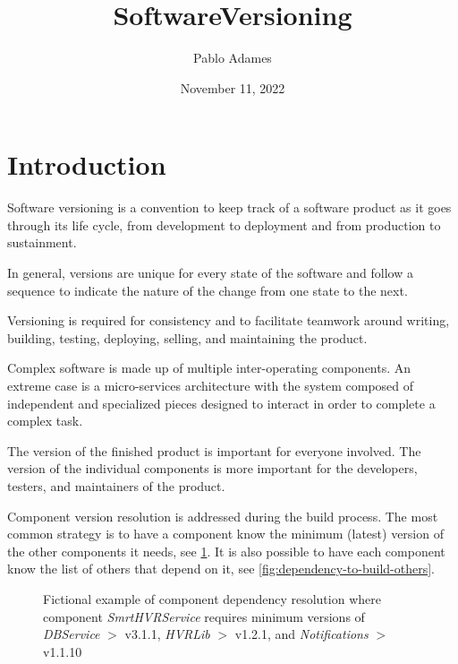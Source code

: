 \documentclass[12pt,dvipsnames]{article}
\title{SoftwareVersioning}
\author{Pablo Adames}
\date{November 11, 2022}
\begin{document}
\maketitle

\section{Introduction}

Software versioning is a convention to keep track of a software product as it goes through its life cycle, from development to deployment and from production to sustainment\cite{Wikipedia_software_version_short}.

In general, versions are unique for every state of the software and follow a sequence to indicate the nature of the change from one state to the next.

Versioning is required for consistency and to facilitate teamwork around writing, building, testing, deploying, selling, and maintaining the product. 


Complex software is made up of multiple inter-operating components. 
An extreme case is a micro-services architecture with the system composed of independent and specialized pieces designed to interact in order to complete a complex task.

The version of the finished product is important for everyone involved. 
The version of the individual components is more important for the developers, testers, and maintainers of the product.

Component version resolution is addressed during the build process.
The most common strategy is to have a component know the minimum (latest) version of the other components it needs, see \ref{fig:dependency-to-build-self}. 
It is also possible to have each component know the list of others that depend on it, see \ref{fig:dependency-to-build-others}.  

\begin{figure}
    \centering
  \caption{Fictional example of component dependency resolution where component \textit{SmrtHVRService} requires minimum versions of \textit{DBService} $>$ v3.1.1, \textit{HVRLib} $>$ v1.2.1, and \textit{Notifications} $>$ v1.1.10}
    \label{fig:dependency-to-build-self}
\end{figure}
\end{document}

